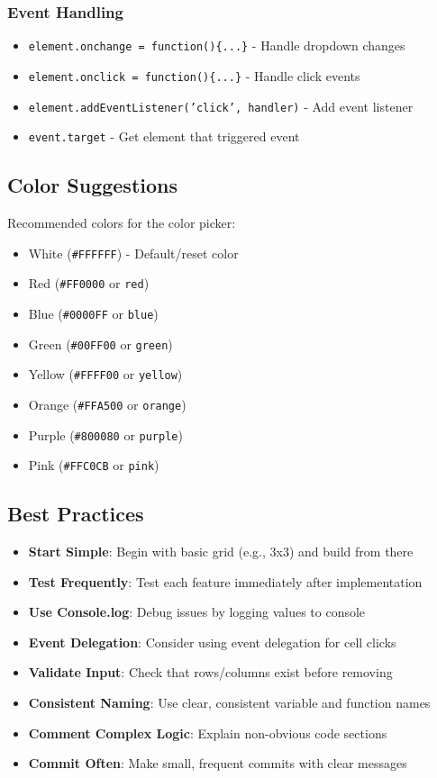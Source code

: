 \documentclass[11pt,a4paper]{article}
\begin{document}
\subsubsection{Event Handling}
\begin{itemize}[leftmargin=*]
    \item \texttt{element.onchange = function()\{...\}} - Handle dropdown changes
    \item \texttt{element.onclick = function()\{...\}} - Handle click events
    \item \texttt{element.addEventListener('click', handler)} - Add event listener
    \item \texttt{event.target} - Get element that triggered event
\end{itemize}

\subsection{Color Suggestions}

Recommended colors for the color picker:
\begin{itemize}[leftmargin=*]
    \item White (\texttt{\#FFFFFF}) - Default/reset color
    \item Red (\texttt{\#FF0000} or \texttt{red})
    \item Blue (\texttt{\#0000FF} or \texttt{blue})
    \item Green (\texttt{\#00FF00} or \texttt{green})
    \item Yellow (\texttt{\#FFFF00} or \texttt{yellow})
    \item Orange (\texttt{\#FFA500} or \texttt{orange})
    \item Purple (\texttt{\#800080} or \texttt{purple})
    \item Pink (\texttt{\#FFC0CB} or \texttt{pink})
\end{itemize}

\subsection{Best Practices}

\begin{itemize}[leftmargin=*]
    \item \textbf{Start Simple}: Begin with basic grid (e.g., 3x3) and build from there
    \item \textbf{Test Frequently}: Test each feature immediately after implementation
    \item \textbf{Use Console.log}: Debug issues by logging values to console
    \item \textbf{Event Delegation}: Consider using event delegation for cell clicks
    \item \textbf{Validate Input}: Check that rows/columns exist before removing
    \item \textbf{Consistent Naming}: Use clear, consistent variable and function names
    \item \textbf{Comment Complex Logic}: Explain non-obvious code sections
    \item \textbf{Commit Often}: Make small, frequent commits with clear messages
\end{itemize}
\end{document}
